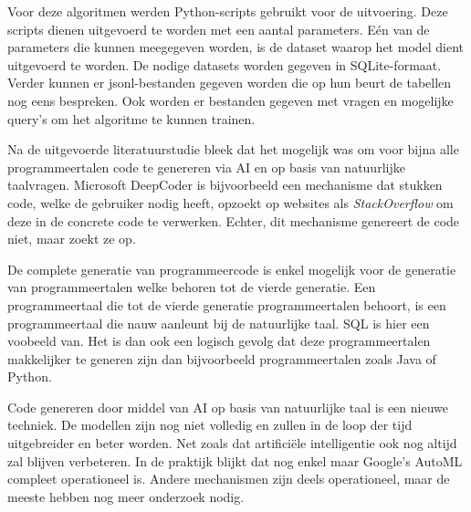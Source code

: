 Voor deze algoritmen werden Python-scripts gebruikt voor de uitvoering. Deze scripts dienen uitgevoerd te worden met een aantal parameters. Eén van de parameters die kunnen meegegeven worden, is de dataset waarop het model dient uitgevoerd te worden. De nodige datasets worden gegeven in SQLite-formaat. Verder kunnen er jsonl-bestanden gegeven worden die op hun beurt de tabellen nog eens bespreken. Ook worden er bestanden gegeven met vragen en mogelijke query's om het algoritme te kunnen trainen.

Na de uitgevoerde literatuurstudie bleek dat het mogelijk was om voor bijna alle programmeertalen code te genereren via AI en op basis van natuurlijke taalvragen. Microsoft DeepCoder is bijvoorbeeld een mechanisme dat stukken code, welke de gebruiker nodig heeft, opzoekt op websites als \textit{StackOverflow} om deze in de concrete code te verwerken. Echter, dit mechanisme genereert de code niet, maar zoekt ze op. 

De complete generatie van programmeercode is enkel mogelijk voor de generatie van programmeertalen welke behoren tot de vierde generatie. Een programmeertaal die tot de vierde generatie programmeertalen behoort, is een programmeertaal die nauw aanleunt bij de natuurlijke taal. SQL is hier een voobeeld van. Het is dan ook een logisch gevolg dat deze programmeertalen makkelijker te generen zijn dan bijvoorbeeld programmeertalen zoals Java of Python.

Code genereren door middel van AI op basis van natuurlijke taal is een nieuwe techniek. De modellen zijn nog niet volledig en zullen in de loop der tijd uitgebreider en beter worden. Net zoals dat artificiële intelligentie ook nog altijd zal blijven verbeteren. In de praktijk blijkt dat nog enkel maar Google's AutoML compleet operationeel is. Andere mechanismen zijn deels operationeel, maar de meeste hebben nog meer onderzoek nodig.
